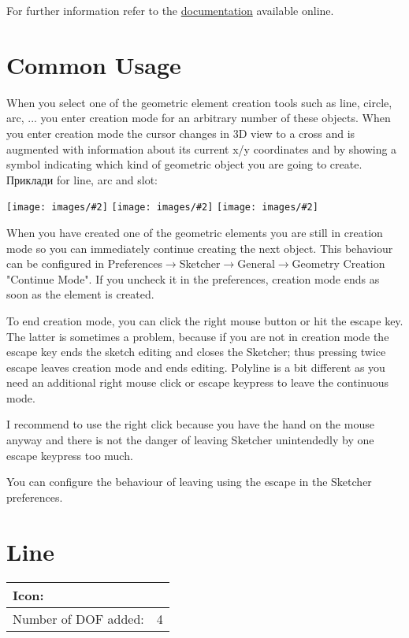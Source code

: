 \documentclass[12pt,titlepage]{article}
\newcommand{\menu}{\mbox{$\rightarrow$}}
\newcommand{\icon}[1]{\raisebox{-1em}{\rule{0pt}{27pt}\texttt{[image: images/\#1]}}}
\newcommand{\img}[2]{\vspace{2ex}\noindent\texttt{[image: images/\#2]}}
\newcommand{\dofAdded}{Number of DOF added:}
\begin{document}
For further information refer to the
\href{https://www.freecadweb.org/wiki/Sketcher_Workbench}{documentation} available online.

\section{Common Usage}
When you select one of the geometric element creation tools such as line,
circle, arc, ...
you enter creation mode for an arbitrary number of these objects. When you
enter creation mode the cursor changes in 3D view to a cross and is augmented
with information about its current x/y coordinates and by showing a symbol
indicating which kind of geometric object you are going to create. Приклади
for line, arc and slot:

\img{width=0.3\textwidth}{CursorLine}\hfill
\img{width=0.3\textwidth}{CursorArc}\hfill
\img{width=0.3\textwidth}{CursorSlot}

When you have created one of the geometric elements you are still in creation mode so
you can immediately continue creating the next object. This behaviour can be
configured in Preferences\menu Sketcher\menu General\menu Geometry Creation "Continue
Mode". If you uncheck it in the preferences, creation mode ends as soon as
the element is created.

To end creation mode, you can click the right mouse button or hit the escape key. The
latter is sometimes a problem, because if you are not in creation mode the escape key
ends the sketch editing and closes the Sketcher; thus pressing twice escape leaves
creation mode and ends editing. Polyline is a bit different as you need an additional
right mouse click or escape keypress to leave the continuous mode.

I recommend to use the right click because you have the
hand on the mouse anyway and there is not the danger of leaving Sketcher unintendedly
by one escape keypress too much.

You can configure the behaviour of leaving using the escape in the Sketcher
preferences.

\section{Line}
\begin{tabular}{|l|l|}
\hline
Icon: & \icon{Sketcher_CreateLine}\\
\hline
\dofAdded & 4\\
\hline
\end{tabular}
\end{document}
